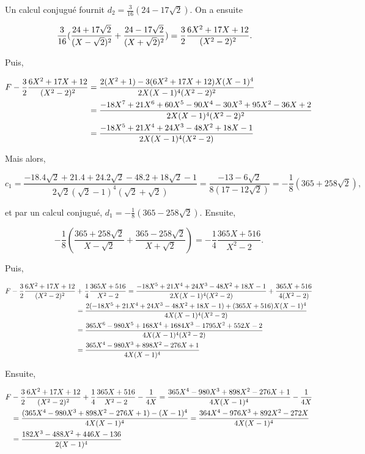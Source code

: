 {{Un calcul conjugué fournit $d_2=\frac{3}{16}(24-17\sqrt{2})$. On a ensuite

\begin{align*}\ensuremath
\frac{3}{16}(\frac{24+17\sqrt{2}}{(X-\sqrt{2})^2}+\frac{24-17\sqrt{2}}{(X+\sqrt{2})^2})&=\frac{3}{2}\frac{6X^2+17X+12}{(X^2-2)^2}.
\end{align*}

Puis,

\begin{align*}\ensuremath
F-\frac{3}{2}\frac{6X^2+17X+12}{(X^2-2)^2}&=\frac{2(X^2+1)-3(6X^2+17X+12)X(X-1)^4}{2X(X-1)^4(X^2-2)^2}\\
 &=\frac{-18X^7+21X^6+60X^5-90X^4-30X^3+95X^2-36X+2}{2X(X-1)^4(X^2-2)^2}\\
 &=\frac{-18X^5+21X^4+24X^3-48X^2+18X-1}{2X(X-1)^4(X^2-2)}
\end{align*}

Mais alors,

$$c_1=\frac{-18.4\sqrt{2}+21.4+24.2\sqrt{2}-48.2+18\sqrt{2}-1}{2\sqrt{2}(\sqrt{2}-1)^4(\sqrt{2}+\sqrt{2})}
=\frac{-13-6\sqrt{2}}{8(17-12\sqrt{2})}=-\frac{1}{8}(365+258\sqrt{2}),$$

et par un calcul conjugué, $d_1=-\frac{1}{8}(365-258\sqrt{2})$. Ensuite,

$$-\frac{1}{8}(\frac{365+258\sqrt{2}}{X-\sqrt{2}}+\frac{365-258\sqrt{2}}{X+\sqrt{2}})=
-\frac{1}{4}\frac{365X+516}{X^2-2}.$$

Puis,

\begin{align*}\ensuremath
F-\frac{3}{2}\frac{6X^2+17X+12}{(X^2-2)^2}&+\frac{1}{4}\frac{365X+516}{X^2-2}=
\frac{-18X^5+21X^4+24X^3-48X^2+18X-1}{2X(X-1)^4(X^2-2)}+\frac{365X+516}{4(X^2-2)}\\
 &=\frac{2(-18X^5+21X^4+24X^3-48X^2+18X-1)+(365X+516)X(X-1)^4}{4X(X-1)^4(X^2-2)}\\
 &=\frac{365X^6-980X^5+168X^4+1684X^3-1795X^2+552X-2}{4X(X-1)^4(X^2-2)}\\
 &=\frac{365X^4-980X^3+898X^2-276X+1}{4X(X-1)^4}
\end{align*}

Ensuite,

\begin{align*}\ensuremath
F&-\frac{3}{2}\frac{6X^2+17X+12}{(X^2-2)^2}+\frac{1}{4}\frac{365X+516}{X^2-2}-\frac{1}{4X}=
\frac{365X^4-980X^3+898X^2-276X+1}{4X(X-1)^4}-\frac{1}{4X}\\
 &=\frac{(365X^4-980X^3+898X^2-276X+1)-(X-1)^4}{4X(X-1)^4}=\frac{364X^4-976X^3+892X^2-272X}{4X(X-1)^4}\\
 &=\frac{182X^3-488X^2+446X-136}{2(X-1)^4}
\end{align*}

}}
